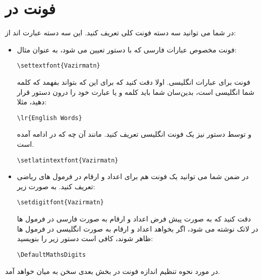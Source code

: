 \section{فونت در }
در  شما می توانید سه دسته فونت کلی تعریف کنید. این سه دسته عبارت اند از:
\begin{itemize}
\item 
فونت مخصوص عبارات فارسی که با دستور  تعیین می شود، به عنوان مثال:
\begin{latin}
\begin{lstlisting}[style=Tex]
\settextfont{Vazirmatn}
\end{lstlisting}
\end{latin}
    فونت برای عبارات انگلیسی. اولا دقت کنید که برای این که  بتواند بفهمد که کلمه شما انگلیسی است، بدین‌سان شما باید کلمه و یا عبارت خود را درون دستور
  قرار دهید، مثلا:
\begin{latin}
\begin{lstlisting}[style=Tex]
 \lr{English Words}
\end{lstlisting}
\end{latin}
و توسط دستور  نیز یک فونت انگلیسی تعریف کنید. مانند آن چه که در ادامه آمده است.
\begin{latin}
\begin{lstlisting}[style=Tex]
\setlatintextfont{Vazirmatn}
\end{lstlisting}
\end{latin}
\item 
    در ضمن شما می توانید یک فونت هم برای اعداد و ارقام در فرمول های ریاضی تعریف کنید. به صورت زیر:
\begin{latin}
\begin{lstlisting}[style=Tex]
\setdigitfont{Vazirmatn}
\end{lstlisting}
\end{latin}
دقت کنید که به صورت پیش فرض اعداد و ارقام به صورت فارسی در فرمول ها در لاتک نوشته می شود، اگر بخواهد اعداد و ارقام به صورت انگلیسی در فرمول ها ظاهر شوند، کافی است دستور زیر را بنویسید:
\begin{latin}
\begin{lstlisting}[style=Tex]
\DefaultMathsDigits
\end{lstlisting}
\end{latin}
\end{itemize}
در مورد نحوه تنظیم اندازه فونت در بخش بعدی سخن به میان خواهد آمد. 
